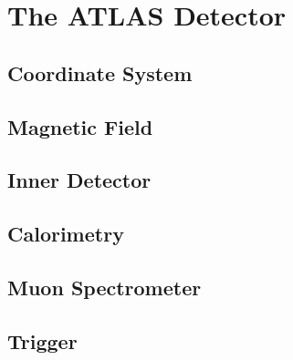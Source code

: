 \chapter{The ATLAS Detector}

\label{ch:atlas}

\section{Coordinate System}


\section{Magnetic Field}


\section{Inner Detector}


\section{Calorimetry}


\section{Muon Spectrometer}


\section{Trigger}


